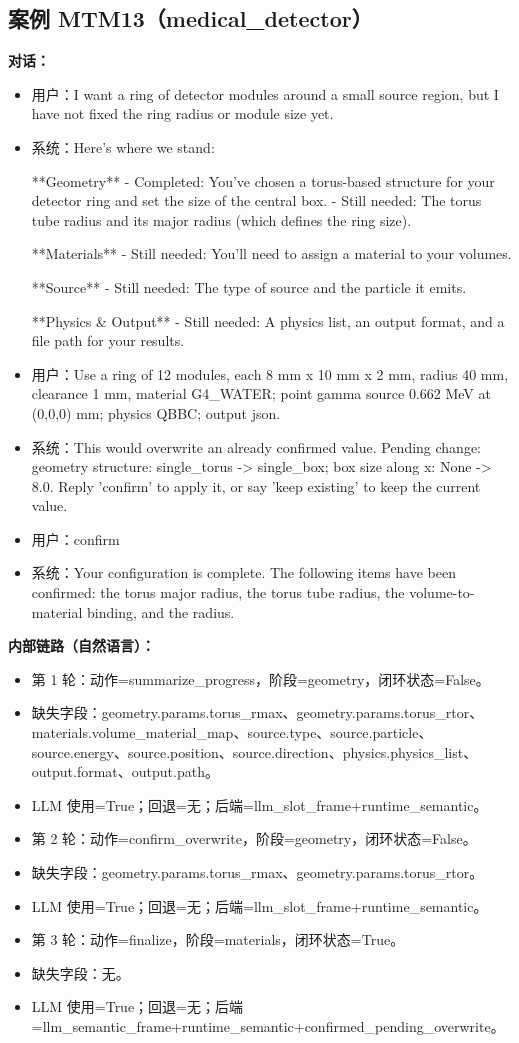 \documentclass[11pt]{ctexart}
\begin{document}
\subsection{案例 MTM13（medical\_detector）}
\textbf{对话：}
\begin{itemize}
\item 用户：I want a ring of detector modules around a small source region, but I have not fixed the ring radius or module size yet.
\item 系统：Here's where we stand:

**Geometry**
- Completed: You've chosen a torus-based structure for your detector ring and set the size of the central box.
- Still needed: The torus tube radius and its major radius (which defines the ring size).

**Materials**
- Still needed: You'll need to assign a material to your volumes.

**Source**
- Still needed: The type of source and the particle it emits.

**Physics \& Output**
- Still needed: A physics list, an output format, and a file path for your results.
\item 用户：Use a ring of 12 modules, each 8 mm x 10 mm x 2 mm, radius 40 mm, clearance 1 mm, material G4\_WATER; point gamma source 0.662 MeV at (0,0,0) mm; physics QBBC; output json.
\item 系统：This would overwrite an already confirmed value. Pending change: geometry structure: single\_torus -> single\_box; box size along x: None -> 8.0. Reply 'confirm' to apply it, or say 'keep existing' to keep the current value.
\item 用户：confirm
\item 系统：Your configuration is complete. The following items have been confirmed: the torus major radius, the torus tube radius, the volume-to-material binding, and the radius.
\end{itemize}
\textbf{内部链路（自然语言）：}
\begin{itemize}
\item 第 1 轮：动作=summarize\_progress，阶段=geometry，闭环状态=False。
\item 缺失字段：geometry.params.torus\_rmax、geometry.params.torus\_rtor、materials.volume\_material\_map、source.type、source.particle、source.energy、source.position、source.direction、physics.physics\_list、output.format、output.path。
\item LLM 使用=True；回退=无；后端=llm\_slot\_frame+runtime\_semantic。
\item 第 2 轮：动作=confirm\_overwrite，阶段=geometry，闭环状态=False。
\item 缺失字段：geometry.params.torus\_rmax、geometry.params.torus\_rtor。
\item LLM 使用=True；回退=无；后端=llm\_slot\_frame+runtime\_semantic。
\item 第 3 轮：动作=finalize，阶段=materials，闭环状态=True。
\item 缺失字段：无。
\item LLM 使用=True；回退=无；后端=llm\_semantic\_frame+runtime\_semantic+confirmed\_pending\_overwrite。
\end{itemize}
\end{document}
